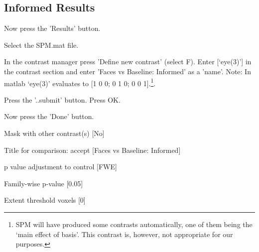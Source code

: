 \subsection{Informed Results}

\bi
\item{Now press the 'Results' button.}
\item{Select the SPM.mat file.}
\item{In the contrast manager press 'Define new contrast' (select F). Enter [`eye(3)'] in the contrast section and enter 'Faces vs Baseline: Informed' as a 'name'. Note: In matlab `eye(3)' evaluates to [1 0 0; 0 1 0; 0 0 1].\footnote{SPM will have produced some contrasts automatically, one of them being the `main effect of basis'. This contrast is, however, not 
appropriate for our purposes.}.}
\item{Press the '..submit' button. Press OK.}
\item{Now press the 'Done' button.}
\item{Mask with other contrast(s) [No]}
\item{Title for comparison: accept [Faces vs Baseline: Informed]}
\item{p value adjustment to control [FWE]}
\item{Family-wise p-value [0.05]}
\item{Extent threshold {voxels} [0]}
\ei

